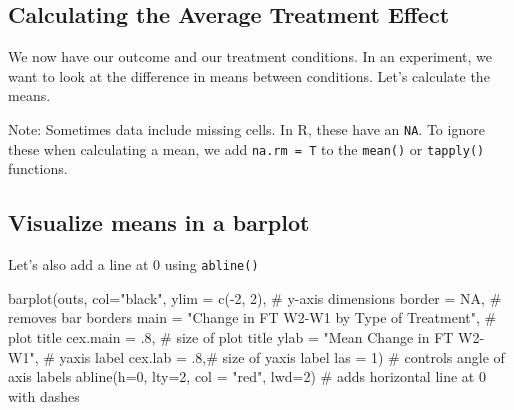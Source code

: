 \documentclass[
  letterpaper,
  DIV=11,
  numbers=noendperiod]{scrreprt}
\newenvironment{Shaded}{\begin{snugshade}}{\end{snugshade}}
\newcommand{\AttributeTok}[1]{\textcolor[rgb]{0.40,0.45,0.13}{#1}}
\newcommand{\CommentTok}[1]{\textcolor[rgb]{0.37,0.37,0.37}{#1}}
\newcommand{\ConstantTok}[1]{\textcolor[rgb]{0.56,0.35,0.01}{#1}}
\newcommand{\DecValTok}[1]{\textcolor[rgb]{0.68,0.00,0.00}{#1}}
\newcommand{\FunctionTok}[1]{\textcolor[rgb]{0.28,0.35,0.67}{#1}}
\newcommand{\NormalTok}[1]{\textcolor[rgb]{0.00,0.23,0.31}{#1}}
\newcommand{\OtherTok}[1]{\textcolor[rgb]{0.00,0.23,0.31}{#1}}
\newcommand{\SpecialCharTok}[1]{\textcolor[rgb]{0.37,0.37,0.37}{#1}}
\newcommand{\StringTok}[1]{\textcolor[rgb]{0.13,0.47,0.30}{#1}}
\begin{document}
\hypertarget{calculating-the-average-treatment-effect}{%
\subsection{Calculating the Average Treatment
Effect}\label{calculating-the-average-treatment-effect}}

We now have our outcome and our treatment conditions. In an experiment,
we want to look at the difference in means between conditions. Let's
calculate the means.

\begin{Shaded}
\end{Shaded}

Note: Sometimes data include missing cells. In R, these have an
\texttt{NA}. To ignore these when calculating a mean, we add
\texttt{na.rm\ =\ T} to the \texttt{mean()} or \texttt{tapply()}
functions.

\hypertarget{visualize-means-in-a-barplot}{%
\subsection{Visualize means in a
barplot}\label{visualize-means-in-a-barplot}}

Let's also add a line at 0 using \texttt{abline()}

\begin{Shaded}
\begin{Highlighting}[]
\FunctionTok{barplot}\NormalTok{(outs,}
        \AttributeTok{col=}\StringTok{"black"}\NormalTok{,}
        \AttributeTok{ylim =}  \FunctionTok{c}\NormalTok{(}\SpecialCharTok{{-}}\DecValTok{2}\NormalTok{, }\DecValTok{2}\NormalTok{), }\CommentTok{\# y{-}axis dimensions}
        \AttributeTok{border =} \ConstantTok{NA}\NormalTok{, }\CommentTok{\# removes bar borders}
        \AttributeTok{main =} \StringTok{"Change in FT W2{-}W1 by Type of Treatment"}\NormalTok{, }\CommentTok{\# plot title}
        \AttributeTok{cex.main =}\NormalTok{ .}\DecValTok{8}\NormalTok{, }\CommentTok{\# size of plot title}
        \AttributeTok{ylab =} \StringTok{"Mean Change in FT W2{-}W1"}\NormalTok{, }\CommentTok{\# yaxis label}
        \AttributeTok{cex.lab =}\NormalTok{ .}\DecValTok{8}\NormalTok{,}\CommentTok{\# size of yaxis label}
        \AttributeTok{las =} \DecValTok{1}\NormalTok{) }\CommentTok{\# controls angle of axis labels}
\FunctionTok{abline}\NormalTok{(}\AttributeTok{h=}\DecValTok{0}\NormalTok{, }\AttributeTok{lty=}\DecValTok{2}\NormalTok{, }\AttributeTok{col =} \StringTok{"red"}\NormalTok{, }\AttributeTok{lwd=}\DecValTok{2}\NormalTok{) }\CommentTok{\# adds horizontal line at 0 with dashes }
\end{Highlighting}
\end{Shaded}
\end{document}
